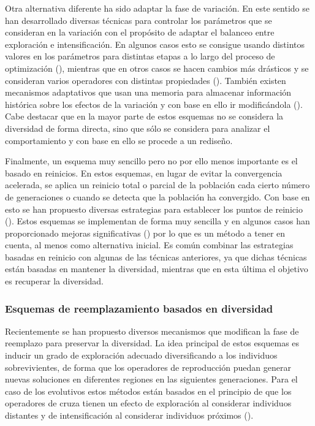 Otra alternativa diferente ha sido adaptar la fase de variación.
%
En este sentido se han desarrollado diversas técnicas para controlar los parámetros que se consideran en la variación 
con el propósito de adaptar el balanceo entre exploración e intensificación.
%
En algunos casos esto se consigue usando distintos valores en los parámetros para distintas etapas a lo largo del proceso de 
optimización (\cite{yu2014differential}), mientras que en otros casos se hacen cambios más drásticos y se consideran varios 
operadores con distintas propiedades (\cite{lobo2007parameter}).
%
También existen mecanismos adaptativos que usan una memoria para almacenar información histórica sobre los efectos de la 
variación y con base en ello ir modificándola (\cite{yuen2009genetic}).
%
Cabe destacar que en la mayor parte de estos esquemas no se considera la diversidad de forma directa, sino que sólo se considera 
para analizar el comportamiento y con base en ello se procede a un rediseño.

Finalmente, un esquema muy sencillo pero no por ello menos importante es el basado en reinicios.
%
En estos esquemas, en lugar de evitar la convergencia acelerada, se aplica un reinicio total o parcial de la población cada 
cierto número de generaciones o cuando se detecta que la población ha convergido.
%
Con base en esto se han propuesto diversas estrategias para establecer los puntos de reinicio (\cite{jansen2002analysis}).
%
Estos esquemas se implementan de forma muy sencilla y en algunos casos han proporcionado mejoras significativas 
(\cite{koumousis2006saw}) por lo que es un método a tener en cuenta, al menos como alternativa inicial.
%
Es común combinar las estrategias basadas en reinicio con algunas de las técnicas anteriores, ya que dichas técnicas están 
basadas en mantener la diversidad, mientras que en esta última el objetivo es recuperar la diversidad.

\subsubsection{Esquemas de reemplazamiento basados en diversidad}

Recientemente se han propuesto diversos mecanismos que modifican la fase de reemplazo para preservar la diversidad.
%
La idea principal de estos esquemas es inducir un grado de exploración adecuado diversificando a los individuos sobrevivientes,
de forma que los operadores de reproducción puedan generar nuevas soluciones en diferentes regiones en las siguientes generaciones.
%
Para el caso de los evolutivos estos métodos están basados en el principio de que los operadores de cruza tienen un 
efecto de exploración al considerar individuos distantes y de intensificación al considerar individuos 
próximos (\cite{eiben1998evolutionary}).

